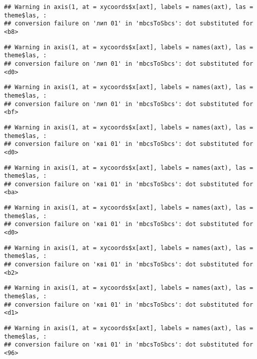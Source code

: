 \documentclass[]{article}
\begin{document}
\begin{verbatim}
## Warning in axis(1, at = xycoords$x[axt], labels = names(axt), las = theme$las, :
## conversion failure on 'лип 01' in 'mbcsToSbcs': dot substituted for <b8>
\end{verbatim}

\begin{verbatim}
## Warning in axis(1, at = xycoords$x[axt], labels = names(axt), las = theme$las, :
## conversion failure on 'лип 01' in 'mbcsToSbcs': dot substituted for <d0>
\end{verbatim}

\begin{verbatim}
## Warning in axis(1, at = xycoords$x[axt], labels = names(axt), las = theme$las, :
## conversion failure on 'лип 01' in 'mbcsToSbcs': dot substituted for <bf>
\end{verbatim}

\begin{verbatim}
## Warning in axis(1, at = xycoords$x[axt], labels = names(axt), las = theme$las, :
## conversion failure on 'кві 01' in 'mbcsToSbcs': dot substituted for <d0>
\end{verbatim}

\begin{verbatim}
## Warning in axis(1, at = xycoords$x[axt], labels = names(axt), las = theme$las, :
## conversion failure on 'кві 01' in 'mbcsToSbcs': dot substituted for <ba>
\end{verbatim}

\begin{verbatim}
## Warning in axis(1, at = xycoords$x[axt], labels = names(axt), las = theme$las, :
## conversion failure on 'кві 01' in 'mbcsToSbcs': dot substituted for <d0>
\end{verbatim}

\begin{verbatim}
## Warning in axis(1, at = xycoords$x[axt], labels = names(axt), las = theme$las, :
## conversion failure on 'кві 01' in 'mbcsToSbcs': dot substituted for <b2>
\end{verbatim}

\begin{verbatim}
## Warning in axis(1, at = xycoords$x[axt], labels = names(axt), las = theme$las, :
## conversion failure on 'кві 01' in 'mbcsToSbcs': dot substituted for <d1>
\end{verbatim}

\begin{verbatim}
## Warning in axis(1, at = xycoords$x[axt], labels = names(axt), las = theme$las, :
## conversion failure on 'кві 01' in 'mbcsToSbcs': dot substituted for <96>
\end{verbatim}
\end{document}
